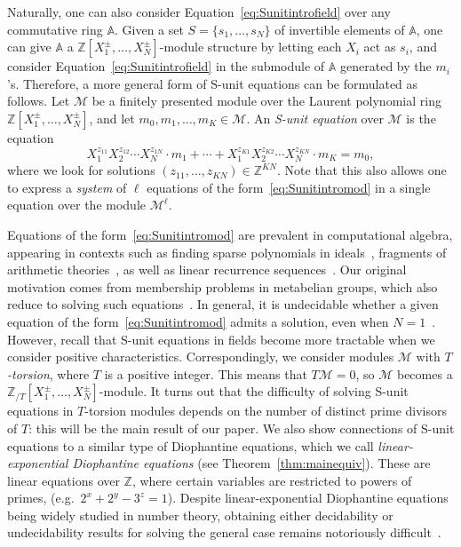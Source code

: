 \documentclass[letterpaper, 11pt, thm-restate]{article}
\numberwithin{equation}{section}
\newcommand{\Z}{\mathbb{Z}}
\newcommand{\A}{\mathbb{A}}
\newcommand{\ZT}{\mathbb{Z}_{/T}}
\newcommand{\mM}{\mathcal{M}}
\newcommand{\red}{\textcolor{red}}
\theoremstyle{definition}
\theoremstyle{definition}
\theoremstyle{definition}
\begin{document}
Naturally, one can also consider Equation~\eqref{eq:Sunitintrofield} over any commutative ring $\A$.
Given a set $S = \{s_1, \ldots, s_N\}$ of invertible elements of $\A$, one can give $\A$ a $\Z[X_1^{\pm}, \ldots, X_N^{\pm}]$-module structure by letting each $X_i$ act as $s_i$, and consider Equation~\eqref{eq:Sunitintrofield} in the submodule of $\A$ generated by the $m_i$'s.
Therefore, a more general form of S-unit equations can be formulated as follows.
Let $\mM$ be a finitely presented module over the Laurent polynomial ring $\Z[X_1^{\pm}, \ldots, X_N^{\pm}]$, and let $m_0, m_1, \ldots, m_K \in \mM$.
An \emph{S-unit equation} over $\mM$ is the equation
    \begin{equation}\label{eq:Sunitintromod}
        X_1^{z_{11}} X_2^{z_{12}} \cdots X_N^{z_{1N}} \cdot m_1 + \cdots + X_1^{z_{K1}} X_2^{z_{K2}} \cdots X_N^{z_{KN}} \cdot m_K = m_0,
    \end{equation}
where we look for solutions $(z_{11}, \ldots, z_{KN}) \in \Z^{KN}$.
Note that this also allows one to express a \emph{system} of $\ell$ equations of the form~\eqref{eq:Sunitintromod} in a single equation over the module $\mM^{\ell}$.

Equations of the form~\eqref{eq:Sunitintromod} are prevalent in computational algebra, appearing in contexts such as finding sparse polynomials in ideals~\cite{jensen2017finding, draisma2023no}, fragments of arithmetic theories~\cite{Hieronymi2022}, as well as linear recurrence sequences~\cite{chonev2013orbit, ibrahim2024positivity}.
Our original motivation comes from membership problems in metabelian groups, which also reduce to solving such equations~\cite{figelius2020complexity, dong2024submonoid}.
In general, it is undecidable whether a given equation of the form~\eqref{eq:Sunitintromod} admits a solution, even when $N = 1$~\cite{Dong2025LinearEW}.
However, recall that S-unit equations in fields become more tractable when we consider positive characteristics.
Correspondingly, we consider modules $\mM$ with \emph{$T$-torsion}, where $T$ is a positive integer.
This means that $T \mM = 0$, so $\mM$ becomes a $\ZT[X_1^{\pm}, \ldots, X_N^{\pm}]$-module.
It turns out that the difficulty of solving S-unit equations in $T$-torsion modules depends on the number of distinct prime divisors of $T$: this will be the main result of our paper.
We also show connections of S-unit equations to a similar type of Diophantine equations, which we call \emph{linear-exponential Diophantine equations} (see Theorem~\ref{thm:mainequiv}).
These are linear equations over $\Z$, where certain variables are restricted to powers of primes, (e.g.\ $2^x + 2^y - 3^z = 1$).
Despite linear-exponential Diophantine equations being widely studied in number theory, obtaining either decidability or undecidability results for solving the general case remains notoriously difficult~\cite{Hieronymi2022, karimov2025decidability}.
\end{document}
